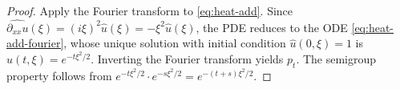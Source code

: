 \begin{proof}
Apply the Fourier transform to \eqref{eq:heat-add}. Since $\widehat{\partial_{xx} u}(\xi) = (i\xi)^2 \widehat{u}(\xi) = -\xi^2 \widehat{u}(\xi)$, the PDE reduces to the ODE \eqref{eq:heat-add-fourier}, whose unique solution with initial condition $\widehat{u}(0, \xi) = 1$ is $\widehat{u}(t, \xi) = e^{-t\xi^2/2}$. Inverting the Fourier transform yields $p_t$. The semigroup property follows from $e^{-t\xi^2/2} \cdot e^{-s\xi^2/2} = e^{-(t+s)\xi^2/2}$.
\end{proof}

